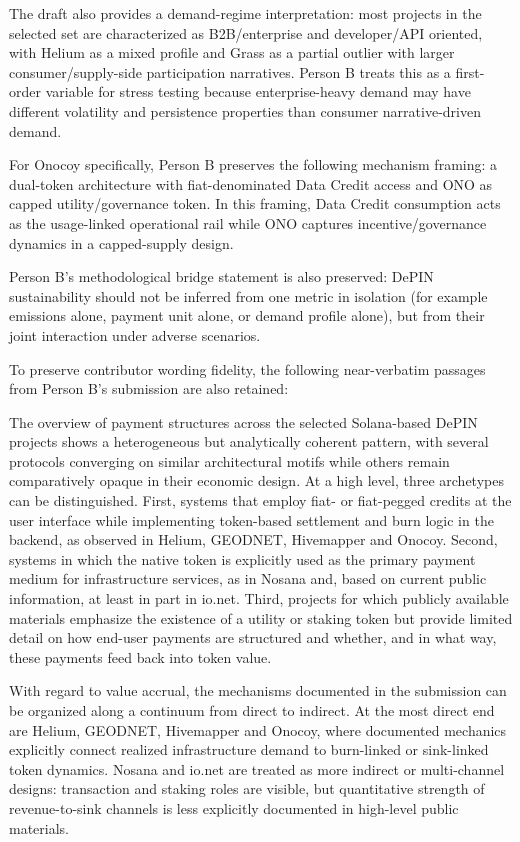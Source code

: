 The draft also provides a demand-regime interpretation: most projects in the selected set are characterized as B2B/enterprise and developer/API oriented, with Helium as a mixed profile and Grass as a partial outlier with larger consumer/supply-side participation narratives. Person B treats this as a first-order variable for stress testing because enterprise-heavy demand may have different volatility and persistence properties than consumer narrative-driven demand.

For Onocoy specifically, Person B preserves the following mechanism framing: a dual-token architecture with fiat-denominated Data Credit access and ONO as capped utility/governance token. In this framing, Data Credit consumption acts as the usage-linked operational rail while ONO captures incentive/governance dynamics in a capped-supply design.

Person B's methodological bridge statement is also preserved: DePIN sustainability should not be inferred from one metric in isolation (for example emissions alone, payment unit alone, or demand profile alone), but from their joint interaction under adverse scenarios.

To preserve contributor wording fidelity, the following near-verbatim passages from Person B's submission are also retained:

The overview of payment structures across the selected Solana-based DePIN projects shows a heterogeneous but analytically coherent pattern, with several protocols converging on similar architectural motifs while others remain comparatively opaque in their economic design. At a high level, three archetypes can be distinguished. First, systems that employ fiat- or fiat-pegged credits at the user interface while implementing token-based settlement and burn logic in the backend, as observed in Helium, GEODNET, Hivemapper and Onocoy. Second, systems in which the native token is explicitly used as the primary payment medium for infrastructure services, as in Nosana and, based on current public information, at least in part in io.net. Third, projects for which publicly available materials emphasize the existence of a utility or staking token but provide limited detail on how end-user payments are structured and whether, and in what way, these payments feed back into token value.

With regard to value accrual, the mechanisms documented in the submission can be organized along a continuum from direct to indirect. At the most direct end are Helium, GEODNET, Hivemapper and Onocoy, where documented mechanics explicitly connect realized infrastructure demand to burn-linked or sink-linked token dynamics. Nosana and io.net are treated as more indirect or multi-channel designs: transaction and staking roles are visible, but quantitative strength of revenue-to-sink channels is less explicitly documented in high-level public materials.

